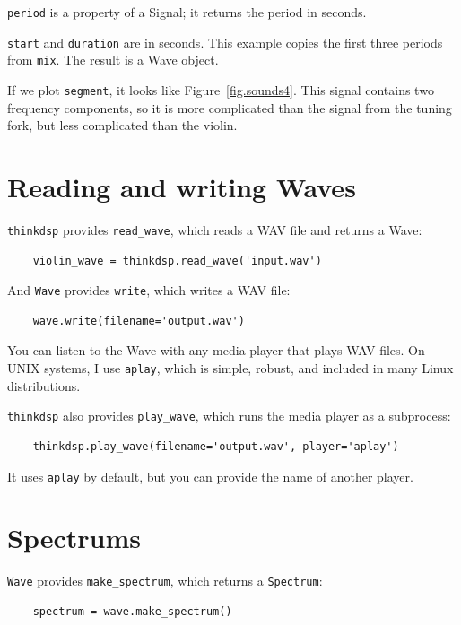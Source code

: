 \documentclass[12pt]{book}
\begin{document}
{\tt period} is a property of a Signal; it returns the period in seconds.

{\tt start} and {\tt duration} are in seconds.  This example copies
the first three periods from {\tt mix}.  The result is a Wave object.

If we plot {\tt segment}, it looks like Figure~\ref{fig.sounds4}.
This signal contains two frequency components, so it is more
complicated than the signal from the tuning fork, but less complicated
than the violin.


\section{Reading and writing Waves}

{\tt thinkdsp} provides \verb"read_wave", which reads a WAV
file and returns a Wave:

\begin{verbatim}
    violin_wave = thinkdsp.read_wave('input.wav')
\end{verbatim}

And {\tt Wave} provides {\tt write}, which writes a WAV file:

\begin{verbatim}
    wave.write(filename='output.wav')
\end{verbatim}

You can listen to the Wave with any media player that plays WAV
files.  On UNIX systems, I use {\tt aplay}, which is simple, robust,
and included in many Linux distributions.

{\tt thinkdsp} also provides \verb"play_wave", which runs
the media player as a subprocess:

\begin{verbatim}
    thinkdsp.play_wave(filename='output.wav', player='aplay')
\end{verbatim}

It uses {\tt aplay} by default, but you can provide the
name of another player.


\section{Spectrums}
\label{spectrums}

{\tt Wave} provides \verb"make_spectrum", which returns a
{\tt Spectrum}:

\begin{verbatim}
    spectrum = wave.make_spectrum()
\end{verbatim}
\end{document}
